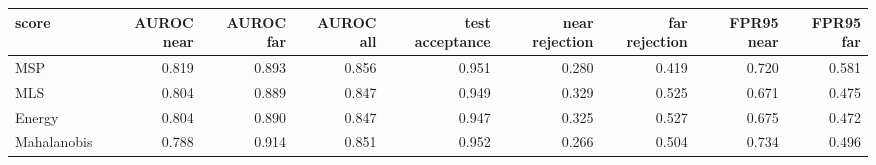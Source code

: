 \begin{tabular}{lrrrrrrrr}
\toprule
score & AUROC near & AUROC far & AUROC all & test acceptance & near rejection & far rejection & FPR95 near & FPR95 far \\
\midrule
MSP & 0.819 & 0.893 & 0.856 & 0.951 & 0.280 & 0.419 & 0.720 & 0.581 \\
MLS & 0.804 & 0.889 & 0.847 & 0.949 & 0.329 & 0.525 & 0.671 & 0.475 \\
Energy & 0.804 & 0.890 & 0.847 & 0.947 & 0.325 & 0.527 & 0.675 & 0.472 \\
Mahalanobis & 0.788 & 0.914 & 0.851 & 0.952 & 0.266 & 0.504 & 0.734 & 0.496 \\
\bottomrule
\end{tabular}
